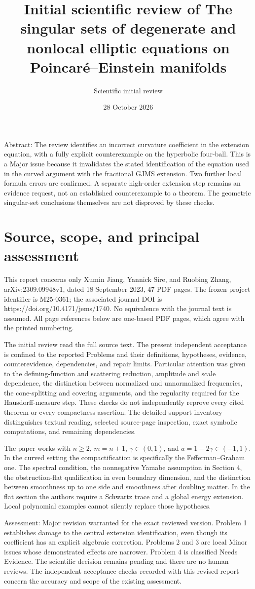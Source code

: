 \documentclass[10pt]{article}
\title{Initial scientific review of
The singular sets of degenerate and nonlocal elliptic equations on Poincaré–Einstein manifolds}
\author{Scientific initial review}
\date{28 October 2026}
\begin{document}
\maketitle
Abstract: The review identifies an incorrect curvature coefficient in the extension equation, with a fully explicit counterexample on the hyperbolic four-ball. This is a Major issue because it invalidates the stated identification of the equation used in the curved argument with the fractional GJMS extension. Two further local formula errors are confirmed. A separate high-order extension step remains an evidence request, not an established counterexample to a theorem. The geometric singular-set conclusions themselves are not disproved by these checks.\par
\section*{Source, scope, and principal assessment}
This report concerns only Xumin Jiang, Yannick Sire, and Ruobing Zhang, arXiv:2309.09948v1, dated 18 September 2023, 47 PDF pages. The frozen project identifier is M25-0361; the associated journal DOI is https://doi.org/10.4171/jems/1740. No equivalence with the journal text is assumed. All page references below are one-based PDF pages, which agree with the printed numbering.\par
The initial review read the full source text. The present independent acceptance is confined to the reported Problems and their definitions, hypotheses, evidence, counterevidence, dependencies, and repair limits. Particular attention was given to the defining-function and scattering reduction, amplitude and scale dependence, the distinction between normalized and unnormalized frequencies, the cone-splitting and covering arguments, and the regularity required for the Hausdorff-measure step. These checks do not independently reprove every cited theorem or every compactness assertion. The detailed support inventory distinguishes textual reading, selected source-page inspection, exact symbolic computations, and remaining dependencies.\par
The paper works with \(n\geq2\), \(m=n+1\), \(\gamma\in(0,1)\), and \(a=1-2\gamma\in(-1,1)\). In the curved setting the compactification is specifically the Fefferman–Graham one. The spectral condition, the nonnegative Yamabe assumption in Section 4, the obstruction-flat qualification in even boundary dimension, and the distinction between smoothness up to one side and smoothness after doubling matter. In the flat section the authors require a Schwartz trace and a global energy extension. Local polynomial examples cannot silently replace those hypotheses.\par
Assessment: Major revision warranted for the exact reviewed version. Problem 1 establishes damage to the central extension identification, even though its coefficient has an explicit algebraic correction. Problems 2 and 3 are local Minor issues whose demonstrated effects are narrower. Problem 4 is classified Needs Evidence. The scientific decision remains pending and there are no human reviews. The independent acceptance checks recorded with this revised report concern the accuracy and scope of the existing assessment.\par
\end{document}
